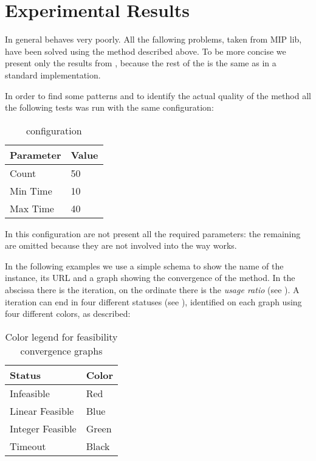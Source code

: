 \section{Experimental Results}

In general \fk{} behaves very poorly. All the fallowing problems, taken from MIP lib, have been solved 
using the method described above. To be more concise we  present only the results from \fk{}, because 
the rest of the \ks{} is the same as in a standard implementation. 

In order to find some patterns and to identify the actual quality of the method all the following tests was
run with the same configuration:
\begin{table}[H]
    \centering
    \begin{tabular}{|l|l|}
        \hline
        Parameter & Value \\ \hline\hline
        Count & 50 \\ \hline
        Min Time & 10 \\ \hline
        Max Time & 40 \\ \hline
    \end{tabular}
    \caption{\fk{} configuration}\label{tab:ks-config}
\end{table}

In this configuration are not present all the required parameters: the remaining are omitted because they are not 
involved into the way \fk{} works.

In the following examples we use a simple schema to show the name of the instance, its URL and a graph showing 
the convergence of the method. In the abscissa there is the \fk{} iteration, on the ordinate there is the \emph{usage ratio} (see ).
A \fk{} iteration can end in four different statuses (see ), identified on each graph using four different colors, as described:
\begin{table}[H]
    \centering
    \begin{tabular}{|l|l|}
        \hline
        Status & Color \\ \hline\hline
        Infeasible & Red \\ \hline
        Linear Feasible & Blue \\ \hline
        Integer Feasible & Green \\ \hline
        Timeout & Black \\ \hline
    \end{tabular}
    \caption{Color legend for feasibility convergence graphs}
\end{table}

